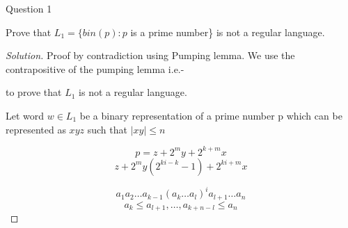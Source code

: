 \begin{solution}{Question 1}\label{ques:1}
    \begin{question}
    Prove that $L_1 = \{bin(p) : p$ is a prime number\} is not a regular language.
    \end{question}
    \tcblower{}
    \begin{proof}[Solution]
    Proof by contradiction using Pumping lemma.
    We use the contrapositive of the pumping lemma i.e.-
    
    to prove that $L_1$ is not a regular language.
    
    Let word $w\in L_1$ be a binary representation of a prime number p which can be represented as $xyz$ such that $|xy|\leq n$
    
    
    
    $$p=z + 2^my + 2^{k+m}x$$
    $$z + 2^my(2^{ki-k}-1) + 2^{ki+m}x$$ %

    $$a_1a_2\ldots a_{k-1} (a_k\ldots a_l)^i a_{l+1}\ldots a_n$$
    $$a_k\leq a_{l+1}, \ldots, a_{k+n-l} \leq a_n$$
    $$$$
    \end{proof}
\end{solution}
